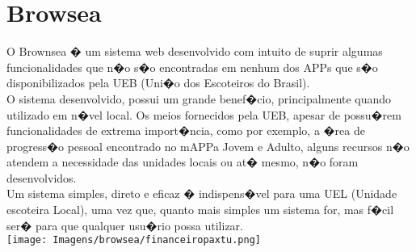 \chapter{Browsea}
\hspace*{0.5cm}O Brownsea � um sistema web desenvolvido com intuito de suprir algumas funcionalidades que n�o s�o encontradas em nenhum dos APPs que s�o disponibilizados pela UEB  (Uni�o dos Escoteiros do Brasil).\\
\hspace*{0.5cm}O sistema desenvolvido, possui um grande benef�cio, principalmente quando utilizado em n�vel local. Os meios fornecidos pela UEB, apesar de possu�rem funcionalidades de extrema import�ncia, como por exemplo, a �rea de progress�o pessoal encontrado no mAPPa Jovem e Adulto, alguns recursos n�o atendem a necessidade das unidades locais ou at� mesmo, n�o foram desenvolvidos.\\
\hspace*{0.5cm}Um sistema simples, direto e eficaz � indispens�vel para uma UEL (Unidade escoteira Local), uma vez que, quanto mais simples um sistema for, mas f�cil ser� para que qualquer usu�rio possa utilizar.\\
\hspace*{1.2cm}\texttt{[image: Imagens/browsea/financeiropaxtu.png]}\\
